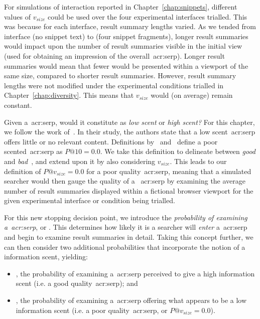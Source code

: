 For simulations of interaction reported in Chapter~\ref{chap:snippets}, different values of $v_{size}$ could be used over the four experimental interfaces trialled. This was because for each interface, result summary lengths varied. As we tended from interface  (no snippet text) to  (four snippet fragments), longer result summaries would impact upon the number of result summaries visible in the initial view (used for obtaining an impression of the overall~\gls{acr:serp}). Longer result summaries would mean that fewer would be presented within a viewport of the same size, compared to shorter result summaries. However, result summary lengths were not modified under the experimental conditions trialled in Chapter~\ref{chap:diversity}. This means that $v_{size}$ would (on average) remain constant.

 Given a~\gls{acr:serp}, would it constitute as \emph{low scent} or \emph{high scent?} For this chapter, we follow the work of~\cite{wu2014information_scent}. In their study, the authors state that a low scent~\gls{acr:serp} offers little or no relevant content. Definitions by~\cite{wu2014information_scent} and~\cite{hassan2013serp_abandonment} define a poor scented~\gls{acr:serp} as $P@10=0.0$. We take this definition to delineate between \emph{good} and \emph{bad}~, and extend upon it by also considering $v_{size}$. This leads to our definition of $P@v_{size}=0.0$ for a poor quality~\gls{acr:serp}, meaning that a simulated searcher would then gauge the quality of a ~\gls{acr:serp} by examining the average number of result summaries displayed within a fictional browser viewport for the given experimental interface or condition being trialled.

 For this new stopping decision point, we introduce the \emph{probability of examining a~\gls{acr:serp}}, or . This determines how likely it is a searcher will \emph{enter} a~\gls{acr:serp} and begin to examine result summaries in detail. Taking this concept further, we can then consider two additional probabilities that incorporate the notion of a~ information scent, yielding:

\begin{itemize}
    \item{, the probability of examining a~\gls{acr:serp} perceived to give a high information scent (i.e. a good quality~\gls{acr:serp}); and}
    \item{, the probability of examining a~\gls{acr:serp} offering what appears to be a low information scent (i.e. a poor quality~\gls{acr:serp}, or $P@v_{size}=0.0$).}
\end{itemize}

